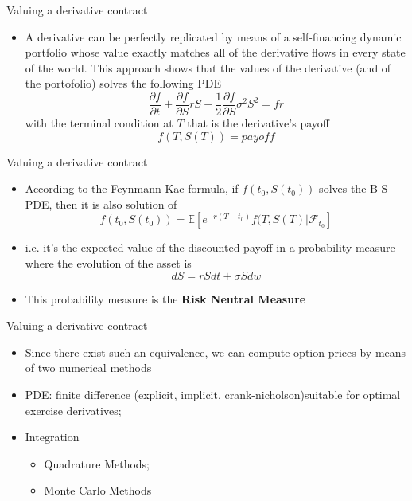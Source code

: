 \documentclass[11pt]{beamer}
\begin{document}
\begin{frame}{Valuing a derivative contract}
\begin{itemize}
\item A derivative can be perfectly replicated by means of a self-financing dynamic portfolio whose value exactly matches all of the derivative flows in every state of the world. This approach shows that the values of the derivative (and of the portofolio) solves the following PDE
\begin{equation}
\frac{\partial f}{\partial t} + \frac{\partial f}{\partial S}rS + \frac{1}{2} \frac{\partial f}{\partial S} \sigma^2 S^2 = fr
\end{equation}
with the terminal condition at $T$ that is the derivative's payoff
$$
f(T, S(T))=payoff
$$
\end{itemize}
\end{frame}
\begin{frame}{Valuing a derivative contract}
\begin{itemize}
\item According to the Feynmann-Kac formula,
if $f(t_0,S(t_0))$ solves the B-S PDE, then it is also solution of
$$
f(t_0, S(t_0)) = \mathbb{E}\left[ e^{-r(T-t_0)} f(T,S(T) \vert \mathcal{F}_{t_0} \right]
$$ 
\item i.e. it’s the expected value of the discounted payoff in a probability measure where the evolution of the asset is
$$dS = rS dt + \sigma S dw$$
\item This probability measure is the \textbf{Risk Neutral Measure}
\end{itemize}
\end{frame}
\begin{frame}{Valuing a derivative contract}
\begin{itemize}
\item Since there exist such an equivalence, we can compute option prices by means of two numerical methods
\item PDE: finite difference (explicit, implicit, crank-nicholson)suitable for optimal exercise derivatives;
\item Integration
\begin{itemize}
\item Quadrature Methods;
\item Monte Carlo Methods 
\end{itemize}
\end{itemize}
\end{frame}
\end{document}
